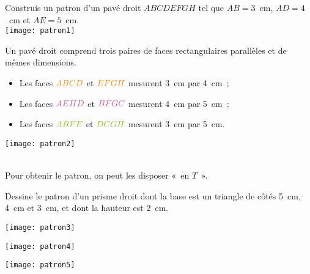 \begin{methode*1}

 \begin{exemple*1}
Construis un patron d'un pavé droit $ABCDEFGH$ tel que $AB = 3$ cm, $AD = 4$ cm et $AE = 5$ cm. \\[1.2em]
\texttt{[image: patron1]} 

 \begin{minipage}[c]{0.6\linewidth}
Un pavé droit comprend trois paires de faces rectangulaires parallèles et de mêmes dimensions.
\begin{itemize}
 \item Les faces ${\textcolor{J1}{ABCD}}$ et $\textcolor{J1}{EFGH}$ mesurent 3 cm par 4 cm ; 
 \item Les faces $\textcolor{C2}{AEHD}$ et $\textcolor{C2}{BFGC}$ mesurent 4 cm par 5 cm ; 
 \item Les faces $\textcolor{H1}{ABFE}$ et $\textcolor{H1}{DCGH}$ mesurent 3 cm par 5 cm.
 \end{itemize}
  \end{minipage} \hfill%
  \begin{minipage}[c]{0.38\linewidth} 
\texttt{[image: patron2]}  
  \end{minipage} \\  
   
Pour obtenir le patron, on peut les disposer « en $T$ ». 
 \end{exemple*1}

 \begin{exemple*1}
Dessine le patron d'un prisme droit dont la base est un triangle de côtés 5 cm, 4 cm et 3 cm, et dont la hauteur est 2 cm. \\[1em]
   
 \begin{minipage}[c]{0.3\linewidth}     
\vspace{-0.2cm}
\begin{center} \texttt{[image: patron3]} \end{center}
  \end{minipage} \hfill%
  \begin{minipage}[c]{0.3\linewidth}
\begin{center} \texttt{[image: patron4]} \end{center}
  \end{minipage} \hfill%
   \begin{minipage}[c]{0.3\linewidth}   
\begin{center} \texttt{[image: patron5]} \end{center}
   \end{minipage} \\
   

\end{exemple*1}
\end{methode*1}
